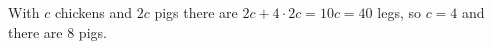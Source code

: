 With $c$ chickens and $2c$ pigs there are $2c+4\cdot2c=10c=40$ legs, so $c=4$ and there are $\boxed{8}$ pigs.

